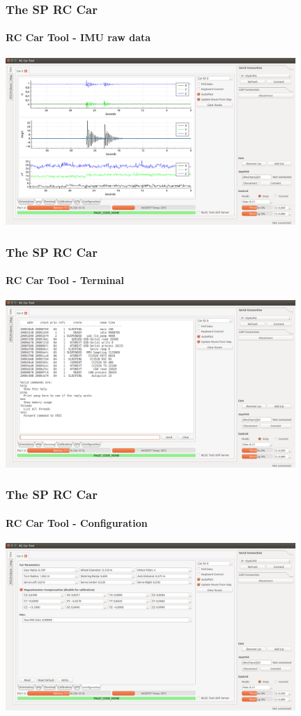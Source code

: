 \documentclass[aspectratio=169,electronics,notopline]{beamer}
\begin{document}
\begin{frame} 
\frametitle{The SP RC Car}
\framesubtitle{RC Car Tool - IMU raw data}
\begin{center}
	\includegraphics[width=11cm]{Figures/GUI/car_imu.png}
\end{center}
\end{frame}

\begin{frame} 
\frametitle{The SP RC Car}
\framesubtitle{RC Car Tool - Terminal}
\begin{center}
	\includegraphics[width=11cm]{Figures/GUI/car_terminal.png}
\end{center}
\end{frame}

\begin{frame} 
\frametitle{The SP RC Car}
\framesubtitle{RC Car Tool - Configuration}
\begin{center}
	\includegraphics[width=11cm]{Figures/GUI/car_config.png}
\end{center}
\end{frame}
\end{document}
